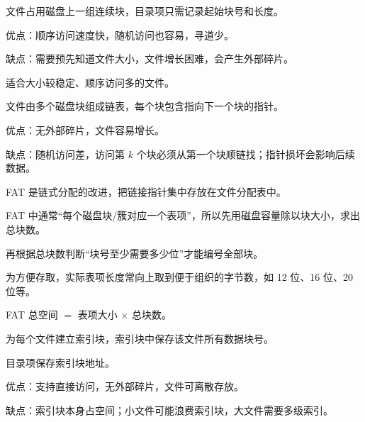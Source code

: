 \begin{points}
  \item 文件占用磁盘上一组连续块，目录项只需记录起始块号和长度。
  \item 优点：顺序访问速度快，随机访问也容易，寻道少。
  \item 缺点：需要预先知道文件大小，文件增长困难，会产生外部碎片。
  \item 适合大小较稳定、顺序访问多的文件。
\end{points}


\begin{points}
  \item 文件由多个磁盘块组成链表，每个块包含指向下一个块的指针。
  \item 优点：无外部碎片，文件容易增长。
  \item 缺点：随机访问差，访问第 $k$ 个块必须从第一个块顺链找；指针损坏会影响后续数据。
  \item FAT 是链式分配的改进，把链接指针集中存放在文件分配表中。
\end{points}


\begin{points}
  \item FAT 中通常“每个磁盘块/簇对应一个表项”，所以先用磁盘容量除以块大小，求出总块数。
  \item 再根据总块数判断“块号至少需要多少位”才能编号全部块。
  \item 为方便存取，实际表项长度常向上取到便于组织的字节数，如 12 位、16 位、20 位等。
  \item FAT 总空间 $=$ 表项大小 $\times$ 总块数。
\end{points}


\begin{points}
  \item 为每个文件建立索引块，索引块中保存该文件所有数据块号。
  \item 目录项保存索引块地址。
  \item 优点：支持直接访问，无外部碎片，文件可离散存放。
  \item 缺点：索引块本身占空间；小文件可能浪费索引块，大文件需要多级索引。
\end{points}


